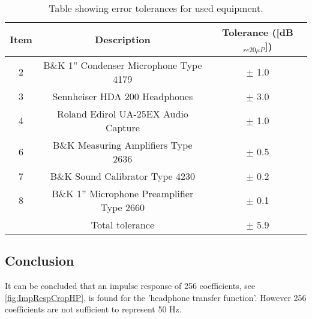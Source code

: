 \begin{table}[H]
	\centering
	\begin{tabular}{ c c c } \toprule
	{Item}	& 		{Description} 							& {Tolerance ([dB$_{re20\mu P}$])}\\ \bottomrule 
		2	&	B\&K 1'' Condenser Microphone Type 4179 	& $\pm$ 1.0 	\cite{BK4179_2660Tol}		\\
		3	&	Sennheiser HDA 200 Headphones				& $\pm$ 3.0	\cite{HDA200Tol}	\\
		4	&	Roland Edirol UA-25EX Audio Capture			& $\pm$ 1.0	\cite{UA25EXTol}	\\
		6	&	B\&K Measuring Amplifiers Type 2636			& $\pm$ 0.5	\cite{BK2636Tol}	\\
		7	&	B\&K Sound Calibrator Type 4230				& $\pm$ 0.2	\cite{BK4231Tol}	\\ 
		8	&	B\&K 1'' Microphone Preamplifier Type 2660	& $\pm$ 0.1	\cite{UA25EXTol}	\\ \bottomrule
			&	Total tolerance								& $\pm$ 5.9		\\ \bottomrule	
	\end{tabular}
	\caption{Table showing error tolerances for used equipment.}
	\label{TolerancesHP}
\end{table}

\subsection{Conclusion}
It can be concluded that an impulse response of 256 coefficients, see \autoref{fig:ImpRespCropHP}, is found for the 'headphone transfer function'. However 256 coefficients are not sufficient to represent 50 Hz.    

